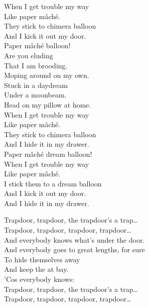 When I get trouble my way \\
Like paper mâché. \\
They stick to chimera balloon \\
And I kick it out my door. \\

Paper mâché  balloon! \\

Are you eluding \\
That I am brooding. \\
Moping around on my own. \\
Stuck in a daydream \\
Under a moonbeam. \\
Head on my pillow at home. \\

When I get trouble my way \\
Like paper mâché. \\
They stick to chimera balloon \\
And I hide it in my drawer. \\

Paper mâché dream balloon! \\

When I get trouble my way \\
Like paper mâché. \\
I stick them to a dream balloon \\
And I kick it out my door. \\
And I hide it in my drawer. \\




Trapdoor, trapdoor, the trapdoor's a trap… \\
Trapdoor, trapdoor, trapdoor, trapdoor… \\

And everybody knows what's under the door. \\
And everybody goes to great lengths, for sure \\
To hide themselves away \\
And keep the  at bay. \\
'Cos everybody knows: \\

Trapdoor, trapdoor, the trapdoor's a trap… \\
Trapdoor, trapdoor, trapdoor, trapdoor… \\

